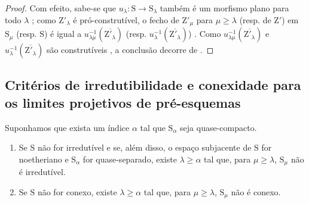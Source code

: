\begin{proof}
Com efeito, sabe-se que $u_\lambda:\mathrm{S}\to\mathrm{S}_\lambda$ também é um morfismo plano para todo $\lambda$ ; como $\mathrm{Z}'_\lambda$ é pró-construtível, o fecho de $\mathrm{Z}'_\mu$ para $\mu\geqslant\lambda$ (resp. de $\mathrm{Z}'$) em $\mathrm{S}_\mu$ (resp. $\mathrm{S}$) é igual a $u_{\lambda\mu}^{-1}(\overline{\mathrm{Z}'_\lambda})$ (resp. $u_\lambda^{-1}(\overline{\mathrm{Z}'_\lambda})$) .
Como $u_{\lambda\mu}^{-1}(\overline{\mathrm{Z}'_\lambda})$ e $u_\lambda^{-1}(\overline{\mathrm{Z}'_\lambda})$ são construtíveis , a conclusão decorre de .
\end{proof}

\subsection{Critérios de irredutibilidade e conexidade para os limites projetivos de pré-esquemas}
\label{subsection:IV.8.4}

\begin{proposition}[8.4.1]
\label{IV.8.4.1}
Suponhamos que exista um índice $\alpha$ tal que $\mathrm{S}_\alpha$ seja quase-compacto.
\begin{enumerate}[label=(\roman*)]
  \item Se $\mathrm{S}$ não for irredutível e se, além disso, o espaço subjacente de $\mathrm{S}$ for noetheriano e $\mathrm{S}_\alpha$ for quase-separado, existe $\lambda\geqslant\alpha$ tal que, para $\mu\geqslant\lambda$, $\mathrm{S}_\mu$ não é irredutível.
  \item Se $\mathrm{S}$ não for conexo, existe $\lambda\geqslant\alpha$ tal que, para $\mu\geqslant\lambda$, $\mathrm{S}_\mu$ não é conexo.
\end{enumerate}
\end{proposition}

